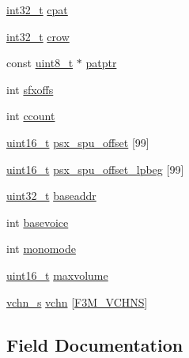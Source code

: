 \begin{DoxyCompactItemize}
\item 
\hyperlink{inttypes_8h_a32f2e37ee053cf2ce8ca28d1f74630e5}{int32\+\_\+t} \hyperlink{structplayer__s_af74eca61b9bd73ff88a71278eb41812a}{cpat}
\item 
\hyperlink{inttypes_8h_a32f2e37ee053cf2ce8ca28d1f74630e5}{int32\+\_\+t} \hyperlink{structplayer__s_a096deec999caf7247e70748c5aa21f99}{crow}
\item 
const \hyperlink{inttypes_8h_aba7bc1797add20fe3efdf37ced1182c5}{uint8\+\_\+t} $\ast$ \hyperlink{structplayer__s_ae0fa290b22546b4b5fc8e97ea99dd026}{patptr}
\item 
int \hyperlink{structplayer__s_a653f0f7aa7453b01d0b637f59d1b4e21}{sfxoffs}
\item 
int \hyperlink{structplayer__s_a7a64d7f824863588a1f0bf03cf18087c}{ccount}
\item 
\hyperlink{inttypes_8h_a273cf69d639a59973b6019625df33e30}{uint16\+\_\+t} \hyperlink{structplayer__s_af3c154d2cbd1c92554e481bdf2e99046}{psx\+\_\+spu\+\_\+offset} \mbox{[}99\mbox{]}
\item 
\hyperlink{inttypes_8h_a273cf69d639a59973b6019625df33e30}{uint16\+\_\+t} \hyperlink{structplayer__s_a1f345d4fe2df8329823cbcdf8991c892}{psx\+\_\+spu\+\_\+offset\+\_\+lpbeg} \mbox{[}99\mbox{]}
\item 
\hyperlink{inttypes_8h_a435d1572bf3f880d55459d9805097f62}{uint32\+\_\+t} \hyperlink{structplayer__s_aa1a3e8675fae7ba40f0c9375251d96a0}{baseaddr}
\item 
int \hyperlink{structplayer__s_a722550b333063b8d13ae6535623168b7}{basevoice}
\item 
int \hyperlink{structplayer__s_ad970c6c606d433f8224ef7bced77b05c}{monomode}
\item 
\hyperlink{inttypes_8h_a273cf69d639a59973b6019625df33e30}{uint16\+\_\+t} \hyperlink{structplayer__s_a9e33cf4247c0395448e0b4337664bfde}{maxvolume}
\item 
\hyperlink{structvchn__s}{vchn\+\_\+s} \hyperlink{structplayer__s_a080fb2e562e73d54c01e416fe8d4910a}{vchn} \mbox{[}\hyperlink{f3m_8h_a029404388ed8137e42bc7c94f667dec6}{F3\+M\+\_\+\+V\+C\+H\+N\+S}\mbox{]}
\end{DoxyCompactItemize}


\subsection{Field Documentation}
\hypertarget{structplayer__s_aa1a3e8675fae7ba40f0c9375251d96a0}{}
